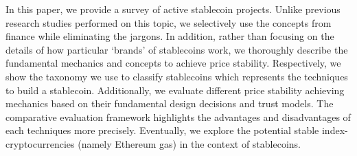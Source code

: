 In this paper, we provide a survey of active stablecoin projects. Unlike previous research studies performed on this topic, we selectively use the concepts from finance while eliminating the jargons. In addition, rather than focusing on the details of how particular `brands' of stablecoins work, we thoroughly describe the fundamental mechanics and concepts to achieve price stability. Respectively, we show the taxonomy we use to classify stablecoins which represents the techniques to build a stablecoin. Additionally, we evaluate different price stability achieving mechanics based on their fundamental design decisions and trust models. The comparative evaluation framework highlights the advantages and disadvantages of each techniques more precisely. Eventually, we explore the potential stable index-cryptocurrencies (namely Ethereum gas) in the context of stablecoins.







